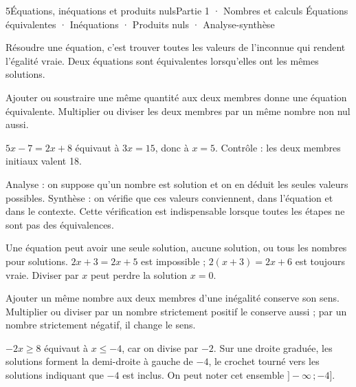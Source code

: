 \begin{ouverture}[courbe]{5}{Équations, inéquations et produits nuls}{Partie 1 · Nombres et calculs}
{Équations équivalentes · Inéquations · Produits nuls · Analyse-synthèse}
\end{ouverture}
\pagestyle{otMain}\essentiel\fontsize{11}{15}\selectfont
{}
\begin{definition}Résoudre une équation, c’est trouver toutes les valeurs de l’inconnue qui rendent l’égalité vraie. Deux équations sont équivalentes lorsqu’elles ont les mêmes solutions.\end{definition}
\begin{propriete}Ajouter ou soustraire une même quantité aux deux membres donne une équation équivalente. Multiplier ou diviser les deux membres par un même nombre non nul aussi.\end{propriete}
\begin{exemple}$5x-7=2x+8$ équivaut à $3x=15$, donc à $x=5$. Contrôle : les deux membres initiaux valent 18.\end{exemple}
\begin{savoirfaire}Analyse : on suppose qu’un nombre est solution et on en déduit les seules valeurs possibles. Synthèse : on vérifie que ces valeurs conviennent, dans l’équation et dans le contexte. Cette vérification est indispensable lorsque toutes les étapes ne sont pas des équivalences.\end{savoirfaire}
\begin{attention}Une équation peut avoir une seule solution, aucune solution, ou tous les nombres pour solutions. $2x+3=2x+5$ est impossible ; $2(x+3)=2x+6$ est toujours vraie. Diviser par $x$ peut perdre la solution $x=0$.\end{attention}
\clearpage
{}
\begin{propriete}Ajouter un même nombre aux deux membres d’une inégalité conserve son sens. Multiplier ou diviser par un nombre strictement positif le conserve aussi ; par un nombre strictement négatif, il change le sens.\end{propriete}
\begin{exemple}$-2x\ge8$ équivaut à $x\le-4$, car on divise par $-2$. Sur une droite graduée, les solutions forment la demi-droite à gauche de $-4$, le crochet tourné vers les solutions indiquant que $-4$ est inclus. On peut noter cet ensemble $]-\infty\,;-4]$.\end{exemple}

